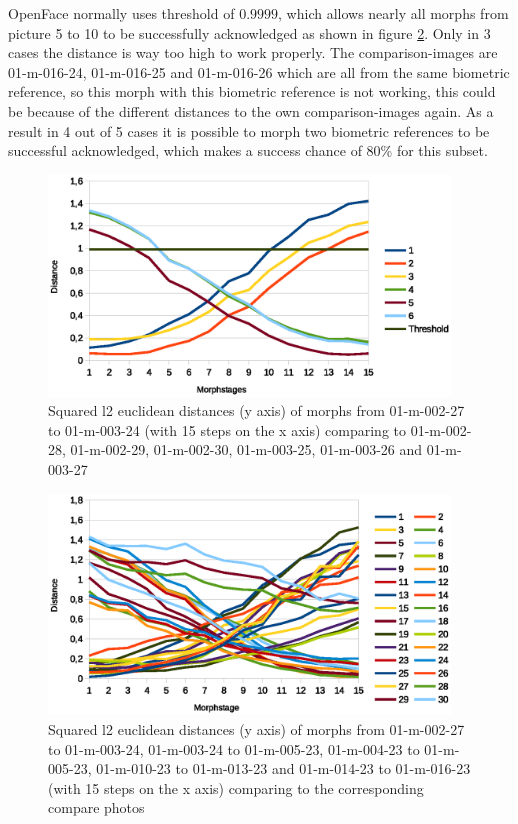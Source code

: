 OpenFace normally uses threshold of \textbf{$0.9999$}, which allows nearly all morphs from picture 5 to 10 to be successfully acknowledged as shown in figure \ref{fig:Result1-5}. Only in 3 cases the distance is way too high to work properly. The comparison-images are 01-m-016-24, 01-m-016-25 and 01-m-016-26 which are all from the same biometric reference, so this morph with this biometric reference is not working, this could be because of the different distances to the own comparison-images again. As a result in 4 out of 5 cases it is possible to morph two biometric references to be successful acknowledged, which makes a success chance of $80$\% for this subset.

\begin{figure}[htbp] 
	\centering
		\includegraphics[width=0.95\textwidth]{Resources/result1ODF.eps}
	\caption{Squared l2 euclidean distances (y axis) of morphs from 01-m-002-27 to 01-m-003-24 (with 15 steps on the x axis) comparing to 01-m-002-28, 01-m-002-29, 01-m-002-30, 01-m-003-25, 01-m-003-26 and 01-m-003-27}
	\label{fig:Result1}
\end{figure}

\begin{figure}[htbp] 
	\centering
		\includegraphics[width=0.95\textwidth]{Resources/result1-5ODF.eps}
	\caption{Squared l2 euclidean distances (y axis) of morphs from 01-m-002-27 to 01-m-003-24, 01-m-003-24 to 01-m-005-23, 01-m-004-23 to 01-m-005-23, 01-m-010-23 to 01-m-013-23 and 01-m-014-23 to 01-m-016-23 (with 15 steps on the x axis) comparing to the corresponding compare photos}
	\label{fig:Result1-5}
\end{figure}

